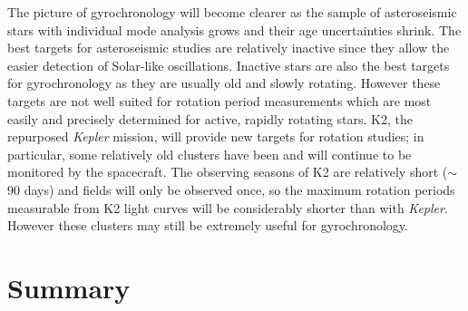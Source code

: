 \documentclass[useAMS, usenatbib]{mn2e}
\begin{document}
The picture of gyrochronology will become clearer as the sample of
asteroseismic stars with individual mode analysis grows and their age
uncertainties shrink.
The best targets for asteroseismic studies are relatively inactive since they
allow the easier detection of Solar-like oscillations.
Inactive stars are also the best targets for gyrochronology as they are
usually old and slowly rotating.
However these targets are not well suited for
rotation period measurements which are most easily and precisely determined
for active, rapidly rotating stars.
K2, the repurposed {\it Kepler} mission, will provide new targets for rotation
studies; in particular, some relatively old clusters have been and will
continue to be monitored by the spacecraft.
The observing seasons of K2 are relatively short ($\sim$ 90 days) and fields
will only be observed once, so the maximum rotation periods measurable from
K2 light curves will be considerably shorter than with {\it Kepler}.
However these clusters may still be extremely useful for gyrochronology.

\section{Summary}
\label{sec:conclusions}
\end{document}
